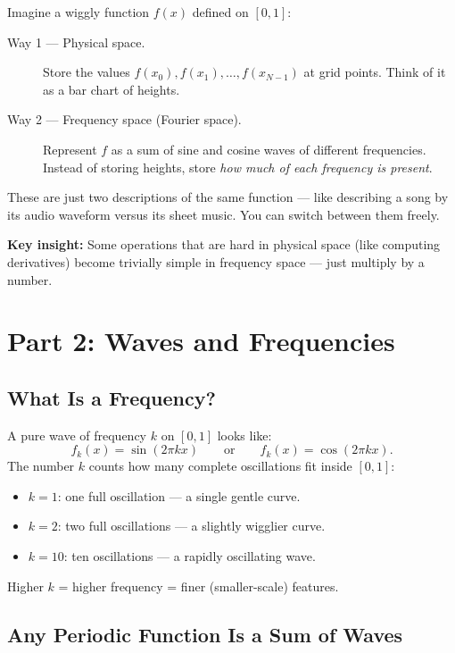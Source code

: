 \documentclass[12pt,a4paper]{article}
\theoremstyle{definition}
\begin{document}
Imagine a wiggly function $f(x)$ defined on $[0,1]$:

\begin{description}
  \item[Way 1 — Physical space.] Store the values
    $f(x_0), f(x_1), \ldots, f(x_{N-1})$ at grid points.  Think of it as a
    bar chart of heights.
  \item[Way 2 — Frequency space (Fourier space).] Represent $f$ as a sum of
    sine and cosine waves of different frequencies.  Instead of storing
    heights, store \emph{how much of each frequency is present}.
\end{description}

These are just two descriptions of the same function — like describing a song
by its audio waveform versus its sheet music.  You can switch between them
freely.

\begin{insightbox}
\textbf{Key insight:} Some operations that are hard in physical space (like
computing derivatives) become trivially simple in frequency space — just
multiply by a number.
\end{insightbox}

\section{Part 2: Waves and Frequencies}

\subsection{What Is a Frequency?}

A pure wave of frequency $k$ on $[0,1]$ looks like:
\[
  f_k(x) = \sin(2\pi k x) \qquad \text{or} \qquad f_k(x) = \cos(2\pi k x).
\]
The number $k$ counts how many complete oscillations fit inside $[0,1]$:
\begin{itemize}
  \item $k=1$: one full oscillation — a single gentle curve.
  \item $k=2$: two full oscillations — a slightly wigglier curve.
  \item $k=10$: ten oscillations — a rapidly oscillating wave.
\end{itemize}
Higher $k$ = higher frequency = finer (smaller-scale) features.

\subsection{Any Periodic Function Is a Sum of Waves}
\end{document}

